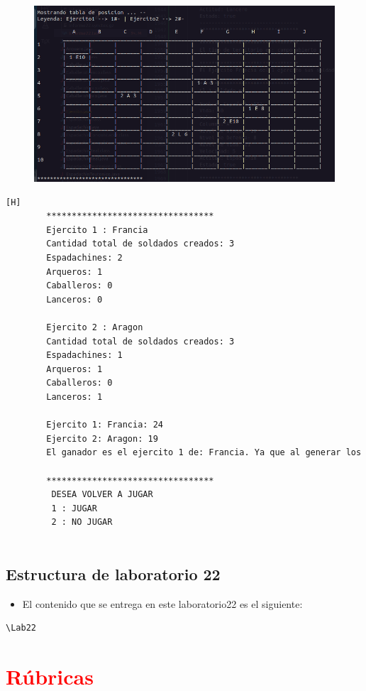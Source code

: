\documentclass{article}
\begin{document}
	\begin{figure}[H]
		\centering
		\includegraphics[width=1.0\textwidth,keepaspectratio]{img/Commit9.png}
	\end{figure}
	\begin{lstlisting}[language=bash,caption={Ejecucion:}][H]
		*********************************
		Ejercito 1 : Francia
		Cantidad total de soldados creados: 3
		Espadachines: 2
		Arqueros: 1
		Caballeros: 0
		Lanceros: 0
		
		Ejercito 2 : Aragon
		Cantidad total de soldados creados: 3
		Espadachines: 1
		Arqueros: 1
		Caballeros: 0
		Lanceros: 1
		
		Ejercito 1: Francia: 24
		Ejercito 2: Aragon: 19
		El ganador es el ejercito 1 de: Francia. Ya que al generar los porcentajes de probabilidad de victoria basada en los niveles de vida de sus soldados y aplicando un experimento aleatorio salio vencedor. (Aleatorio generado : 55.81)
		
		*********************************
		 DESEA VOLVER A JUGAR
		 1 : JUGAR
		 2 : NO JUGAR
			
	\end{lstlisting}
	\subsection{Estructura de laboratorio 22}
	\begin{itemize}	
		\item El contenido que se entrega en este laboratorio22 es el siguiente:
	\end{itemize}
	\begin{lstlisting}[style=ascii-tree]
	\Lab22
	\end{lstlisting}    
	\section{\textcolor{red}{Rúbricas}}
	
\end{document}
